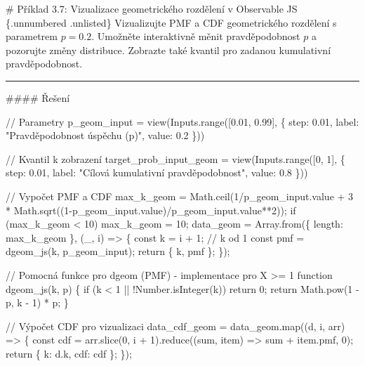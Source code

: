 \documentclass[
  czech,
  11pt,
  letterpaper,
  DIV=11,
  numbers=noendperiod]{scrreprt}
\newenvironment{Shaded}{\begin{snugshade}}{\end{snugshade}}
\newcommand{\NormalTok}[1]{\textcolor[rgb]{0.00,0.23,0.31}{#1}}
\begin{document}
\begin{tcolorbox}[enhanced jigsaw, arc=.35mm, bottomrule=.15mm, bottomtitle=1mm, breakable, colback=white, colbacktitle=quarto-callout-note-color!10!white, colframe=quarto-callout-note-color-frame, coltitle=black, left=2mm, leftrule=.75mm, opacityback=0, opacitybacktitle=0.6, rightrule=.15mm, title=\textcolor{quarto-callout-note-color}{\faInfo}\hspace{0.5em}{Poznámka}, titlerule=0mm, toprule=.15mm, toptitle=1mm]

\# Příklad 3.7: Vizualizace geometrického rozdělení v Observable JS
\{.unnumbered .unlisted\} Vizualizujte PMF a CDF geometrického rozdělení
s parametrem \(p=0.2\). Umožněte interaktivně měnit pravděpodobnost
\(p\) a pozorujte změny distribuce. Zobrazte také kvantil pro zadanou
kumulativní pravděpodobnost.

\begin{center}\rule{0.5\linewidth}{0.5pt}\end{center}

\#\#\#\# Řešení

\begin{Shaded}
\begin{Highlighting}[]
\NormalTok{// Parametry}
\NormalTok{p\_geom\_input = view(Inputs.range([0.01, 0.99], \{ step: 0.01, label: "Pravděpodobnost úspěchu (p)", value: 0.2 \}))}

\NormalTok{// Kvantil k zobrazení}
\NormalTok{target\_prob\_input\_geom = view(Inputs.range([0, 1], \{ step: 0.01, label: "Cílová kumulativní pravděpodobnost", value: 0.8 \}))}

\NormalTok{// Vypočet PMF a CDF}
\NormalTok{max\_k\_geom = Math.ceil(1/p\_geom\_input.value + 3 * Math.sqrt((1{-}p\_geom\_input.value)/p\_geom\_input.value**2));}
\NormalTok{if (max\_k\_geom \textless{} 10) max\_k\_geom = 10;}
\NormalTok{data\_geom = Array.from(\{ length: max\_k\_geom \}, (\_, i) =\textgreater{} \{}
\NormalTok{  const k = i + 1; // k od 1}
\NormalTok{  const pmf = dgeom\_js(k, p\_geom\_input);}
\NormalTok{  return \{ k, pmf \};}
\NormalTok{\});}

\NormalTok{// Pomocná funkce pro dgeom (PMF) {-} implementace pro X \textgreater{}= 1}
\NormalTok{function dgeom\_js(k, p) \{}
\NormalTok{  if (k \textless{} 1 || !Number.isInteger(k)) return 0;}
\NormalTok{  return Math.pow(1 {-} p, k {-} 1) * p;}
\NormalTok{\}}

\NormalTok{// Výpočet CDF pro vizualizaci}
\NormalTok{data\_cdf\_geom = data\_geom.map((d, i, arr) =\textgreater{} \{}
\NormalTok{  const cdf = arr.slice(0, i + 1).reduce((sum, item) =\textgreater{} sum + item.pmf, 0);}
\NormalTok{  return \{ k: d.k, cdf: cdf \};}
\NormalTok{\});}


\end{Highlighting}
\end{Shaded}
\end{tcolorbox}
\end{document}
